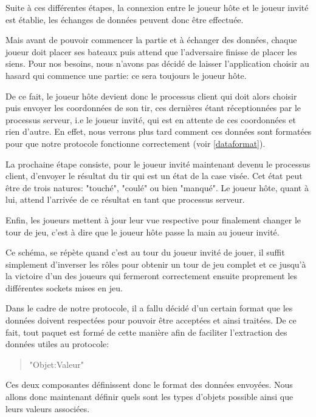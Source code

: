 			Suite à ces différentes étapes, la connexion entre le joueur hôte et le joueur invité est établie, les échanges de données peuvent donc être effectuée.

			Mais avant de pouvoir commencer la partie et à échanger des données, chaque joueur doit placer ses bateaux puis attend que l'adversaire finisse de placer les siens. Pour nos besoins, nous n'avons pas décidé de laisser l'application choisir au hasard qui commence une partie: ce sera toujours le joueur hôte. \newline
			
			De ce fait, le joueur hôte devient donc le processus client qui doit alors choisir puis envoyer les coordonnées de son tir, ces dernières étant réceptionnées par le processus serveur, i.e le joueur invité, qui est en attente de ces coordonnées et rien d'autre. En effet, nous verrons plus tard comment ces données sont formatées pour que notre protocole fonctionne correctement (voir \ref{dataformat}).  \newline
			
			La prochaine étape consiste, pour le joueur invité maintenant devenu le processus client, d'envoyer le résultat du tir qui est un état de la case visée. Cet état peut être de trois natures: "touché", "coulé" ou bien "manqué". Le joueur hôte, quant à lui, attend l'arrivée de ce résultat en tant que processus serveur.\newline \label{states}
			
			Enfin, les joueurs mettent à jour leur vue respective pour finalement changer le tour de jeu, c'est à dire que le joueur hôte passe la main au joueur invité. \newline
			
			Ce schéma, se répète quand c'est au tour du joueur invité de jouer, il suffit simplement d'inverser les rôles pour obtenir un tour de jeu complet et ce jusqu'à la victoire d'un des joueurs qui fermeront correctement ensuite proprement les différentes sockets mises en jeu.
			
		\label{dataformat}
			Dans le cadre de notre protocole, il a fallu décidé d'un certain format que les données doivent respectées pour pouvoir être acceptées et ainsi traitées. De ce fait, tout paquet est formé de cette manière afin de faciliter l'extraction des données utiles au protocole:
			\begin{quote}
				"Objet:Valeur"
			\end{quote}
			Ces deux composantes définissent donc le format des données envoyées. Nous allons donc maintenant définir quels sont les types d'objets possible ainsi que leurs valeurs associées.
			
